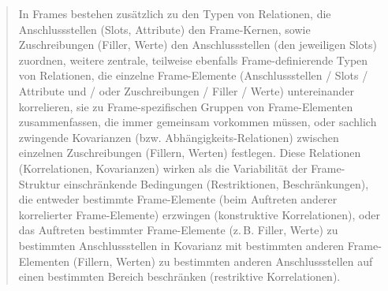\begin{quote}
In Frames bestehen zusätzlich zu den Typen von Relationen, die Anschlussstellen (Slots, Attribute) den Frame-Kernen, sowie Zuschreibungen (Filler, Werte) den Anschlussstellen (den jeweiligen Slots) zuordnen, weitere zentrale, teilweise ebenfalls Frame-definierende Typen von Relationen, die einzelne Frame-Elemente (Anschlussstellen / Slots / Attribute und / oder Zuschreibungen / Filler / Werte) untereinander korrelieren, sie zu Frame-spezifischen Gruppen von Frame-Elementen zusammenfassen, die immer gemeinsam vorkommen müssen, oder sachlich zwingende Kovarianzen (bzw. Abhängigkeits-Relationen) zwischen einzelnen Zuschreibungen (Fillern, Werten) festlegen. Diese Relationen (Korrelationen, Kovarianzen) wirken als die Variabilität der Frame-Struktur einschränkende Bedingungen (Restriktionen, Beschränkungen), die entweder bestimmte Frame-Elemente (beim Auftreten anderer korrelierter Frame-Elemente) erzwingen (konstruktive Korrelationen), oder das Auftreten bestimmter Frame-Elemente (z.\,B. Filler, Werte) zu bestimmten Anschlussstellen in Kovarianz mit bestimmten anderen Frame-Elementen (Fillern, Werten) zu bestimmten anderen Anschlussstellen auf einen bestimmten Bereich beschränken (restriktive Korrelationen). \autocite[570-571]{busseFrameSemantikKompendium2012}
\end{quote}
\largerpage
